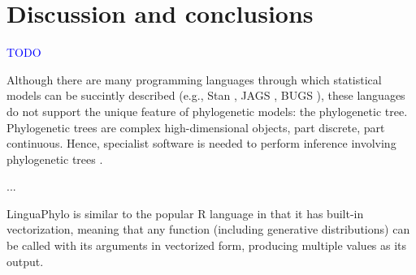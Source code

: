 \documentclass[10pt,letterpaper,table]{article}
\begin{document}
{%




\section*{Discussion and conclusions}
\textcolor{blue}{TODO}

Although there are many
programming languages through which statistical 
models can be succintly described (e.g., Stan
\cite{carpenter2017stan}, JAGS \cite{plummer2003jags}, BUGS
\cite{lunn2009bugs, gilks1994language}), these languages do not
support the unique feature of phylogenetic models: the phylogenetic
tree.
Phylogenetic trees are complex high-dimensional objects, part
discrete, part continuous.
Hence, specialist software is needed to perform inference
involving phylogenetic trees
\cite{hohna2016revbayes,bouckaert2019beastanalysis}.

...

LinguaPhylo is similar to the popular R language \cite{R} in that it
has built-in vectorization, meaning that any function (including
generative distributions) can be called with its arguments in
vectorized form, producing multiple values as its output. 


}
\end{document}
